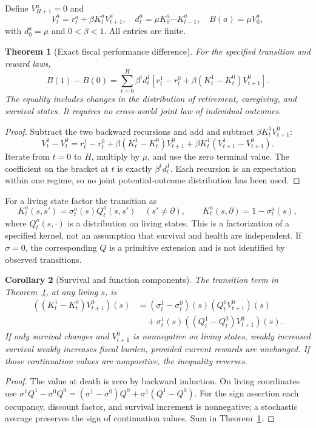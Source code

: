 \documentclass[11pt]{article}
\newtheorem{theorem}{Theorem}
\newtheorem{corollary}[theorem]{Corollary}
\theoremstyle{remark}
\begin{document}
Define $V_{H+1}^a=0$ and
\[
 V_t^a=r_t^a+\beta K_t^a V_{t+1}^a,
 \quad d_t^a=\mu K_0^a\cdots K_{t-1}^a,
 \quad B(a)=\mu V_0^a,
\]
with $d_0^a=\mu$ and $0<\beta<1$. All entries are finite.

\begin{theorem}[Exact fiscal performance difference]\label{difference}
For the specified transition and reward laws,
\[
 B(1)-B(0)=\sum_{t=0}^{H}\beta^t d_t^1
 \left[r_t^1-r_t^0+\beta(K_t^1-K_t^0)V_{t+1}^0\right].
\]
The equality includes changes in the distribution of retirement, caregiving, and survival states. It requires no cross-world joint law of individual outcomes.
\end{theorem}
\begin{proof}
Subtract the two backward recursions and add and subtract $\beta K_t^1V_{t+1}^0$:
\[
 V_t^1-V_t^0=r_t^1-r_t^0+\beta(K_t^1-K_t^0)V_{t+1}^0
                 +\beta K_t^1(V_{t+1}^1-V_{t+1}^0).
\]
Iterate from $t=0$ to $H$, multiply by $\mu$, and use the zero terminal value. The coefficient on the bracket at $t$ is exactly $\beta^td_t^1$. Each recursion is an expectation within one regime, so no joint potential-outcome distribution has been used.
\end{proof}

For a living state factor the transition as
\[
 K_t^a(s,s')=\sigma_t^a(s)Q_t^a(s,s')\quad(s'\ne\partial),
 \qquad K_t^a(s,\partial)=1-\sigma_t^a(s),
\]
where $Q_t^a(s,\cdot)$ is a distribution on living states. This is a factorization of a specified kernel, not an assumption that survival and health are independent. If $\sigma=0$, the corresponding $Q$ is a primitive extension and is not identified by observed transitions.

\begin{corollary}[Survival and function components]\label{split}
The transition term in Theorem~\ref{difference}, at any living $s$, is
\begin{align*}
 ((K_t^1-K_t^0)V_{t+1}^0)(s)
 &= (\sigma_t^1-\sigma_t^0)(s)(Q_t^0V_{t+1}^0)(s)\\
 &\quad+\sigma_t^1(s)((Q_t^1-Q_t^0)V_{t+1}^0)(s).
\end{align*}
If only survival changes and $V_{t+1}^0$ is nonnegative on living states, weakly increased survival weakly increases fiscal burden, provided current rewards are unchanged. If those continuation values are nonpositive, the inequality reverses.
\end{corollary}
\begin{proof}
The value at death is zero by backward induction. On living coordinates use
$\sigma^1Q^1-\sigma^0Q^0=(\sigma^1-\sigma^0)Q^0+\sigma^1(Q^1-Q^0)$.
For the sign assertion each occupancy, discount factor, and survival increment is nonnegative; a stochastic average preserves the sign of continuation values. Sum in Theorem~\ref{difference}.
\end{proof}
\end{document}
